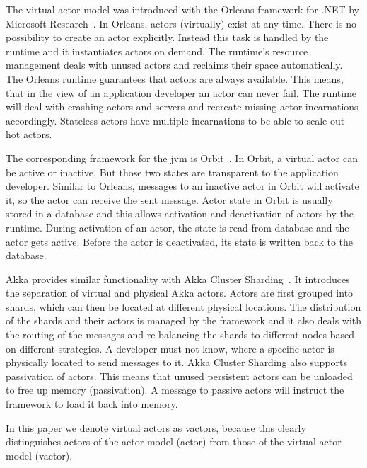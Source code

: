   The virtual actor model was introduced with the Orleans framework for .NET by Microsoft Research~\cite{bernstein:orleans}.
  In Orleans, actors (virtually) exist at any time.
  There is no possibility to create an actor explicitly.
  Instead this task is handled by the runtime and it instantiates actors on demand.
  The runtime's resource management deals with unused actors and reclaims their space automatically.
  The Orleans runtime guarantees that actors are always available.
  This means, that in the view of an application developer an actor can never fail.
  The runtime will deal with crashing actors and servers and recreate missing actor incarnations accordingly.
  Stateless actors have multiple incarnations to be able to scale out hot actors.

  The corresponding framework for the \gls{jvm} is Orbit~\cite{orbit}.
  In Orbit, a virtual actor can be active or inactive.
  But those two states are transparent to the application developer.
  Similar to Orleans, messages to an inactive actor in Orbit will activate it, so the actor can receive the sent message.
  Actor state in Orbit is usually stored in a database and this allows activation and deactivation of actors by the runtime.
  During activation of an actor, the state is read from database and the actor gets active.
  Before the actor is deactivated, its state is written back to the database.

  Akka provides similar functionality with Akka Cluster Sharding~\cite{akka:clustersharding}.
  It introduces the separation of virtual and physical Akka actors.
  Actors are first grouped into shards, which can then be located at different physical locations.
  The distribution of the shards and their actors is managed by the framework and it also deals with the routing of the messages and re-balancing the shards to different nodes based on different strategies.
  A developer must not know, where a specific actor is physically located to send messages to it.
  Akka Cluster Sharding also supports passivation of actors.
  This means that unused persistent actors can be unloaded to free up memory (passivation).
  A message to passive actors will instruct the framework to load it back into memory.

  In this paper we denote virtual actors as vactors, because this clearly distinguishes actors of the actor model (actor) from those of the virtual actor model (vactor).


